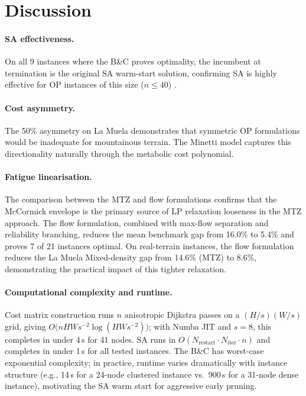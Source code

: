 \documentclass[preprint,11pt]{elsarticle}
\begin{document}
\section{Discussion}
\label{sec:discussion}

\paragraph{SA effectiveness.}
On all 9 instances where the B\&C proves optimality, the incumbent at termination is the original SA warm-start solution, confirming SA is highly effective for OP instances of this size ($n \leq 40$) \citep{vansteenwegen2011orienteering}.

\paragraph{Cost asymmetry.}
The 50\% asymmetry on La Muela demonstrates that symmetric OP formulations would be inadequate for mountainous terrain.
The Minetti model captures this directionality naturally through the metabolic cost polynomial.

\paragraph{Fatigue linearisation.}
The comparison between the MTZ and flow formulations confirms that the McCormick envelope is the primary source of LP relaxation looseness in the MTZ approach.
The flow formulation, combined with max-flow separation and reliability branching, reduces the mean benchmark gap from 16.0\% to 5.4\% and proves 7 of 21 instances optimal.
On real-terrain instances, the flow formulation reduces the La Muela Mixed-density gap from 14.6\% (MTZ) to 8.6\%, demonstrating the practical impact of this tighter relaxation.

\paragraph{Computational complexity and runtime.}
Cost matrix construction runs $n$ anisotropic Dijkstra passes on a $(H/s)(W/s)$ grid, giving $O\bigl(nHW s^{-2} \log(HWs^{-2})\bigr)$; with Numba JIT and $s = 8$, this completes in under 4\,s for 41 nodes.
SA runs in $O(N_{\text{restart}} \cdot N_{\text{iter}} \cdot n)$ and completes in under 1\,s for all tested instances.
The B\&C has worst-case exponential complexity; in practice, runtime varies dramatically with instance structure (e.g., 14\,s for a 24-node clustered instance vs.\ 900\,s for a 31-node dense instance), motivating the SA warm start for aggressive early pruning.
\end{document}
